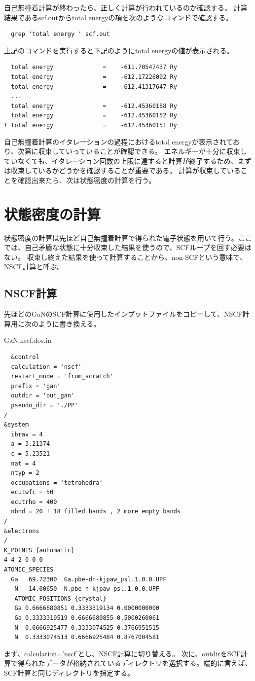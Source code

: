自己無撞着計算が終わったら、正しく計算が行われているのか確認する。
計算結果であるscf.outからtotal energyの項を次のようなコマンドで確認する。
\begin{code}
\begin{verbatim}
  grep 'total energy ' scf.out
\end{verbatim}
\end{code}
上記のコマンドを実行すると下記のようにtotal energyの値が表示される。
\begin{code}
\begin{verbatim}
  total energy              =    -611.70547437 Ry
  total energy              =    -612.17226092 Ry
  total energy              =    -612.41317647 Ry
  ...
  total energy              =    -612.45360188 Ry
  total energy              =    -612.45360152 Ry
! total energy              =    -612.45360151 Ry
\end{verbatim}
\end{code}
自己無撞着計算のイタレーションの過程におけるtotal energyが表示されており、次第に収束していっていることが確認できる。
エネルギーが十分に収束していなくても、イタレーション回数の上限に達すると計算が終了するため、まずは収束しているかどうかを確認することが重要である。
計算が収束していることを確認出来たら、次は状態密度の計算を行う。
\section{状態密度の計算}
状態密度の計算は先ほど自己無撞着計算で得られた電子状態を用いて行う。ここでは、自己矛盾な状態に十分収束した結果を使うので、SCFループを回す必要はない。
収束し終えた結果を使って計算することから、non-SCFという意味で、NSCF計算と呼ぶ。

\subsection{NSCF計算}
先ほどのGaNのSCF計算に使用したインプットファイルをコピーして、NSCF計算用に次のように書き換える。
\begin{example}{GaN.nscf.dos.in}
\begin{verbatim}
  &control
  calculation = 'nscf'
  restart_mode = 'from_scratch'
  prefix = 'gan'
  outdir = 'out_gan'
  pseudo_dir = './PP'
/
&system
  ibrav = 4
  a = 3.21374
  c = 5.23521
  nat = 4
  ntyp = 2
  occupations = 'tetrahedra'
  ecutwfc = 50
  ecutrho = 400
  nbnd = 20 ! 18 filled bands , 2 more empty bands
/
&electrons
/
K_POINTS {automatic}
4 4 2 0 0 0
ATOMIC_SPECIES
  Ga   69.72300  Ga.pbe-dn-kjpaw_psl.1.0.0.UPF
   N   14.00650  N.pbe-n-kjpaw_psl.1.0.0.UPF
   ATOMIC_POSITIONS {crystal}
   Ga 0.6666680851 0.3333319134 0.0000000000
   Ga 0.3333319519 0.6666680855 0.5000260061
   N  0.6666925477 0.3333074525 0.3766951515
   N  0.3333074513 0.6666925484 0.8767004581
\end{verbatim}
\end{example}
まず、calculation='nscf'とし、NSCF計算に切り替える。
次に、outdirをSCF計算で得られたデータが格納されているディレクトリを選択する。端的に言えば、SCF計算と同じディレクトリを指定する。

